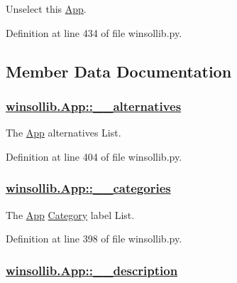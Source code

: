 Unselect this \hyperlink{classwinsollib_1_1App}{App}. 



Definition at line 434 of file winsollib.py.

\subsection{Member Data Documentation}
\hypertarget{classwinsollib_1_1App_c1d444b0231d2ba86a08617d1453d805}{
\subsubsection[\_\-\_\-alternatives]{\setlength{\rightskip}{0pt plus 5cm}\hyperlink{classwinsollib_1_1App_c1d444b0231d2ba86a08617d1453d805}{winsollib.App::\_\-\_\-alternatives}}}
\label{classwinsollib_1_1App_c1d444b0231d2ba86a08617d1453d805}


The \hyperlink{classwinsollib_1_1App}{App} alternatives List. 



Definition at line 404 of file winsollib.py.\hypertarget{classwinsollib_1_1App_b4d2c14dc071e723f8f0904530af0df1}{
\subsubsection[\_\-\_\-categories]{\setlength{\rightskip}{0pt plus 5cm}\hyperlink{classwinsollib_1_1App_b4d2c14dc071e723f8f0904530af0df1}{winsollib.App::\_\-\_\-categories}}}
\label{classwinsollib_1_1App_b4d2c14dc071e723f8f0904530af0df1}


The \hyperlink{classwinsollib_1_1App}{App} \hyperlink{classwinsollib_1_1Category}{Category} label List. 



Definition at line 398 of file winsollib.py.\hypertarget{classwinsollib_1_1App_3d6590ce450fc5acfcf7d5fba34db99b}{
\subsubsection[\_\-\_\-description]{\setlength{\rightskip}{0pt plus 5cm}\hyperlink{classwinsollib_1_1App_3d6590ce450fc5acfcf7d5fba34db99b}{winsollib.App::\_\-\_\-description}}}
\label{classwinsollib_1_1App_3d6590ce450fc5acfcf7d5fba34db99b}


